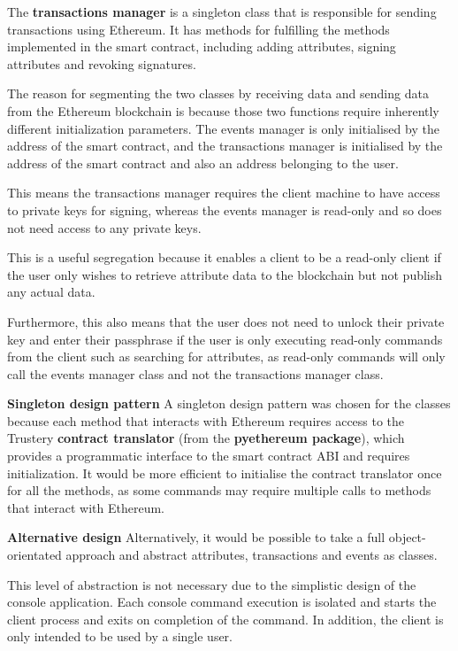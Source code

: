 \documentclass[12pt]{report}
\begin{document}
	The \textbf{transactions manager} is a singleton class that is responsible for sending transactions using Ethereum. It has methods for fulfilling the methods implemented in the smart contract, including adding attributes, signing attributes and revoking signatures.
	
	The reason for segmenting the two classes by receiving data and sending data from the Ethereum blockchain is because those two functions require inherently different initialization parameters. The events manager is only initialised by the address of the smart contract, and the transactions manager is initialised by the address of the smart contract and also an address belonging to the user.
	
	This means the transactions manager requires the client machine to have access to private keys for signing, whereas the events manager is read-only and so does not need access to any private keys.
	
	This is a useful segregation because it enables a client to be a read-only client if the user only wishes to retrieve attribute data to the blockchain but not publish any actual data.
	
	Furthermore, this also means that the user does not need to unlock their private key and enter their passphrase if the user is only executing read-only commands from the client such as searching for attributes, as read-only commands will only call the events manager class and not the transactions manager class.
	
	\bigskip
	\noindent \textbf{Singleton design pattern}\newline
	A singleton design pattern was chosen for the classes because each method that interacts with Ethereum requires access to the Trustery \textbf{contract translator} (from the \textbf{pyethereum package}), which provides a programmatic interface to the smart contract ABI and requires initialization. It would be more efficient to initialise the contract translator once for all the methods, as some commands may require multiple calls to methods that interact with Ethereum.
	
	\bigskip
	\noindent \textbf{Alternative design}\newline
	Alternatively, it would be possible to take a full object-orientated approach and abstract attributes, transactions and events as classes.
	
	This level of abstraction is not necessary due to the simplistic design of the console application. Each console command execution is isolated and starts the client process and exits on completion of the command. In addition, the client is only intended to be used by a single user.
	
\end{document}
